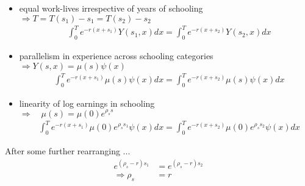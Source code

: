 \begin{frame}
\begin{itemize}
\item equal work-lives irrespective of years of schooling \\\vspace{0.3cm}
\hspace{0.3cm}$\Rightarrow T = T(s_1) - s_1 = T(s_2) - s_2$\vspace{0.3cm}
\begin{align*}
&\int_{0}^T e^{-r(x + s_1)}Y(s_1, x) dx  = \int_{0}^T e^{-r(x + s_2)}Y(s_2, x) dx
\end{align*}
\end{itemize}
\end{frame}

\begin{frame}
\begin{itemize}
\item parallelism in experience across schooling categories \\\vspace{0.3cm}
\hspace{0.3cm}$\Rightarrow Y(s, x) = \mu(s)\psi(x)$\vspace{0.3cm}
\begin{align*}
&\int_{0}^T e^{-r(x + s_1)} \mu(s)\psi(x) dx  = \int_{0}^T e^{-r(x + s_2)} \mu(s)\psi(x)dx
\end{align*}
\end{itemize}
\end{frame}


\begin{frame}
\begin{itemize}
\item linearity of log earnings in schooling \\\vspace{0.3cm}
\hspace{0.3cm}$\Rightarrow\quad \mu(s) = \mu(0)e^{\rho_s s}$\vspace{0.3cm}
\begin{align*}
&\int_{0}^T e^{-r(x + s_1)} \mu(0)e^{\rho_s s_1}\psi(x) dx  = \int_{0}^T e^{-r(x + s_2)} \mu(0)e^{\rho_s s_2}\psi(x)dx
\end{align*}
\end{itemize}
\end{frame}

\begin{frame}
After some further rearranging ...
\begin{align*}
e^{(\rho_s - r)s_1} & = e^{(\rho_s - r) s_2} \\
\Rightarrow \rho_s  & = r
\end{align*}
\end{frame}

